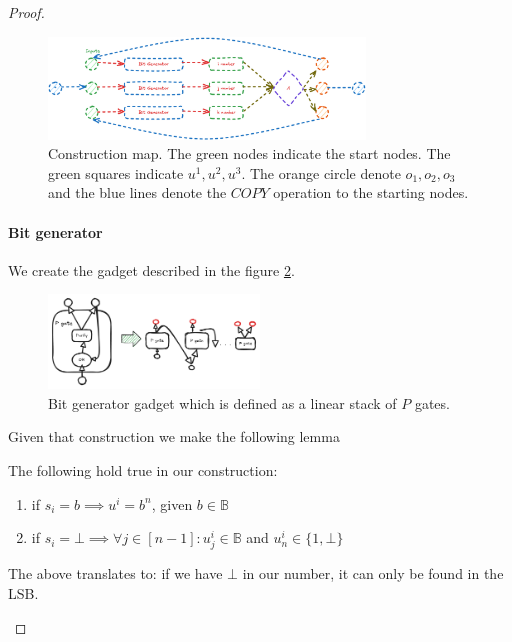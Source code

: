 \begin{proof}
\begin{figure}[h!]
    \centering
    \includegraphics[width=0.75\textwidth]{assets/reduction_sketch.png}
    \caption{Construction map. The green nodes indicate the start nodes. The green squares indicate $u^1, u^2, u^3$. The orange circle denote
    $o_1, o_2, o_3$ and the blue lines denote the $\textit{COPY}$ operation to the starting nodes.}
    \label{fig:main-proof:visualisation}
\end{figure}


\paragraph{Bit generator}

We create the gadget described in the figure \ref{fig:main-proof:purification}.

\begin{figure}[h!]
    \centering
    \includegraphics[width=0.5\textwidth, clip]{assets/purification_generator.png}
    \caption{Bit generator gadget which is defined as a linear stack of $P$ gates.} 
    \label{fig:main-proof:purification}
\end{figure}
\FloatBarrier

Given that construction we make the following lemma

\begin{lemma}
    \label{lem:bit-gen}
    The following hold true in our construction:
    \begin{enumerate}
        \item if $s_i = b \implies u^i = b^n$, given $b \in \mathbb{B}$
        \item if $s_i = \bot \implies \forall j \in [n-1]: u^i_j \in \mathbb{B}$ and $u^i_{n} \in \{1, \bot\}$
    \end{enumerate}
    The above translates to: if we have $\bot$ in our number, it can only be found in the LSB.
\end{lemma}


\end{proof}
